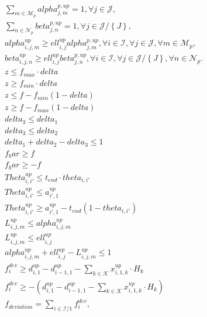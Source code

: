 \begin{align}
  & \sum_{m \in \mathcal{M}_{p}} \mathit{alpha}_{j , m}^{p , up} = 1 , \forall j \in \mathcal{J} , \tag{eq\_0039} \\
  & \sum_{n \in \mathcal{N}_{p}} \mathit{beta}_{j , n}^{p , up} = 1 , \forall j \in \mathcal{J} / \left\{J\right\} , \tag{eq\_0040} \\
  & \mathit{alpha}_{i , j , m}^{up} \geq \mathit{ell}_{i , j}^{up} \mathit{alpha}_{j , m}^{p , up} , \forall i \in \mathcal{I} , \forall j \in \mathcal{J} , \forall m \in \mathcal{M}_{p} , \tag{eq\_0041} \\
  & \mathit{beta}_{i , j , n}^{up} \geq \mathit{ell}_{i , j}^{up} \mathit{beta}_{j , n}^{p , up} , \forall i \in \mathcal{I} , \forall j \in \mathcal{J} / \left\{J\right\} , \forall n \in \mathcal{N}_{p} . \tag{eq\_0042} \\
  & z \leq f_{max} \cdot \mathit{delta} \tag{eq\_0043\_a} \\
  & z \geq f_{min} \cdot \mathit{delta} \tag{eq\_0043\_b} \\
  & z \leq f - f_{min} \left(1 - \mathit{delta}\right) \tag{eq\_0043\_c} \\
  & z \geq f - f_{max} \left(1 - \mathit{delta}\right) \tag{eq\_0043\_d} \\
  & \mathit{delta}_{3} \leq \mathit{delta}_{1} \tag{eq\_0044\_a} \\
  & \mathit{delta}_{3} \leq \mathit{delta}_{2} \tag{eq\_0044\_b} \\
  & \mathit{delta}_{1} + \mathit{delta}_{2} - \mathit{delta}_{3} \leq 1 \tag{eq\_0044\_c} \\
  & f_bar \geq f \tag{eq\_0045\_a} \\
  & f_bar \geq - f \tag{eq\_0045\_b} \\
  & \mathit{Theta}_{i , i '}^{up} \leq t_{end} \cdot \mathit{theta}_{i , i '} \tag{eq\_0046\_a} \\
  & \mathit{Theta}_{i , i '}^{up} \leq a_{i ' , 1}^{up} \tag{eq\_0046\_c} \\
  & \mathit{Theta}_{i , i '}^{up} \geq a_{i ' , 1}^{up} - t_{end} \left(1 - \mathit{theta}_{i , i '}\right) \tag{eq\_0046\_d} \\
  & L_{i , j , m}^{up} \leq \mathit{alpha}_{i , j , m}^{up} \tag{eq\_0047\_a} \\
  & L_{i , j , m}^{up} \leq \mathit{ell}_{i , j}^{up} \tag{eq\_0047\_b} \\
  & \mathit{alpha}_{i , j , m}^{up} + \mathit{ell}_{i , j}^{up} - L_{i , j , m}^{up} \leq 1 \tag{eq\_0047\_c} \\
  & f_{i}^{dev} \geq d_{i , 1}^{up} - d_{i - 1 , 1}^{up} - \sum_{k \in \mathcal{K}} x_{i , 1 , k}^{up} \cdot H_{k} \tag{eq\_0048\_a} \\
  & f_{i}^{dev} \geq - \left(d_{i , 1}^{up} - d_{i - 1 , 1}^{up} - \sum_{k \in \mathcal{K}} x_{i , 1 , k}^{up} \cdot H_{k}\right) \tag{eq\_0048\_b} \\
  & f_{deviation} = \sum_{i \in \mathcal{I} / 1} f_{i}^{dev} , \tag{eq\_0049} \\
\end{align}
